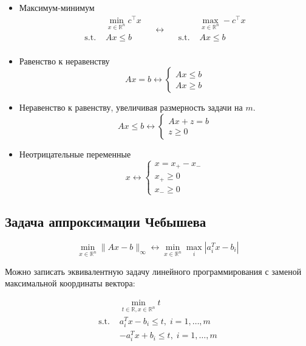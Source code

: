 \documentclass[
  russian,
  letterpaper,
  DIV=11,
  numbers=noendperiod]{scrartcl}
\begin{document}
\begin{itemize}
\item
  Максимум-минимум \[
    \begin{split}
    &\min_{x \in \mathbb{R}^n} c^{\top}x \\
    \text{s.t. } & Ax \leq b\\
    \end{split} \quad \leftrightarrow \quad
    \begin{split}
    &\max_{x \in \mathbb{R}^n} -c^{\top}x \\
    \text{s.t. } & Ax \leq b\\
    \end{split} 
    \]
\item
  Равенство к неравенству \[
    Ax = b \leftrightarrow 
    \begin{cases}
    Ax \leq  b\\
    Ax \geq b
    \end{cases}
    \]
\item
  Неравенство к равенству, увеличивая размерность задачи на \(m\). \[
    Ax \leq b \leftrightarrow 
    \begin{cases}
    Ax + z =  b\\
    z \geq 0
    \end{cases}
    \]
\item
  Неотрицательные переменные \[
    x \leftrightarrow 
    \begin{cases}
    x = x_+ - x_-\\
    x_+ \geq 0 \\
    x_- \geq 0
    \end{cases}
    \]
\end{itemize}

\subsection{Задача аппроксимации
Чебышева}\label{ux437ux430ux434ux430ux447ux430-ux430ux43fux43fux440ux43eux43aux441ux438ux43cux430ux446ux438ux438-ux447ux435ux431ux44bux448ux435ux432ux430}

\[
\min_{x \in \mathbb{R}^n} \|Ax - b\|_\infty \leftrightarrow \min_{x \in \mathbb{R}^n} \max_{i} |a_i^T x - b_i|
\]

Можно записать эквивалентную задачу линейного программирования с заменой
максимальной координаты вектора:

\[
\begin{split}
&\min_{t \in \mathbb{R}, x \in \mathbb{R}^n} t \\
\text{s.t. } & a_i^T x - b_i \leq t, \; i = 1,\dots, m\\
& -a_i^T x + b_i \leq t, \; i = 1,\dots, m
\end{split}
\]
\end{document}
